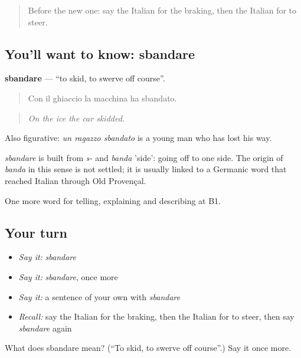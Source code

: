\label{lesson:IT-C406-sbandare}



\begin{quote}
Before the new one: say the Italian for the braking, then the Italian for to steer.
\end{quote}

\subsection*{You'll want to know: sbandare}
\textbf{sbandare} — \textquotedblleft{}to skid, to swerve off course\textquotedblright{}.

\begin{quote}
Con il ghiaccio la macchina ha sbandato.
\end{quote}

\begin{quote}
\emph{On the ice the car skidded.}
\end{quote}

Also figurative: \emph{un ragazzo sbandato} is a young man who has lost his way.

\begin{cousinweb}
\emph{sbandare} is built from \emph{s-} and \emph{banda} 'side': going off to one side. The origin of \emph{banda} in this sense is not settled; it is usually linked to a Germanic word that reached Italian through Old Provençal.
\end{cousinweb}

\begin{grammarlens}[title={What you've built}]
One more word for telling, explaining and describing at B1.
\end{grammarlens}

\subsection*{Your turn}
\begin{itemize}
\raggedright
  \item \emph{Say it:} \emph{sbandare}
  \item \emph{Say it:} \emph{sbandare}, once more
  \item \emph{Say it:} a sentence of your own with \emph{sbandare}
  \item \emph{Recall:} say the Italian for the braking, then the Italian for to steer, then say \emph{sbandare} again
\end{itemize}

\begin{tcolorbox}[breakable,colback=teal!4,colframe=teal!35!black,title={Before you move on}]
What does sbandare mean? (\textquotedblleft{}To skid, to swerve off course\textquotedblright{}.) Say it once more.
\end{tcolorbox}

